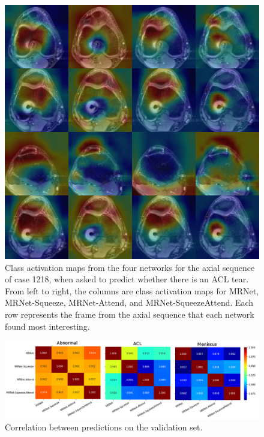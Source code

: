 \documentclass[10pt,twocolumn,letterpaper]{article}
\begin{document}
\begin{figure}
\begin{center}
\includegraphics[width=0.9\linewidth]{../images/cams/4x4.png}
\end{center}
   \caption{Class activation maps from the four networks for the axial sequence of case 1218, when asked to predict whether there is an ACL tear. From left to right, the columns are class activation maps for MRNet, MRNet-Squeeze, MRNet-Attend, and MRNet-SqueezeAttend. Each row represents the frame from the axial sequence that each network found most interesting.}
\label{fig:cam_4x4}
\end{figure}

\begin{figure}
\begin{center}
\includegraphics[width=0.9\linewidth]{../images/corr/corr.png}
\end{center}
   \caption{Correlation between predictions on the validation set.}
\label{fig:mrnet_auc}
\end{figure}
\end{document}
